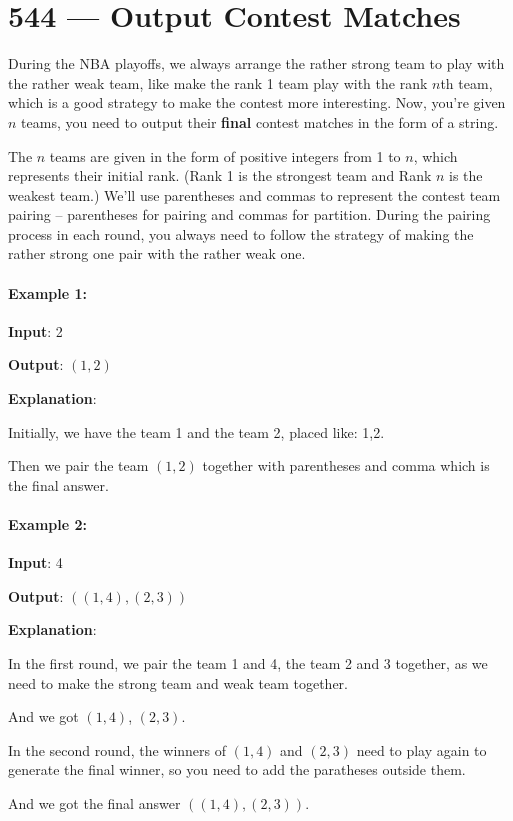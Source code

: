 \section{544 --- Output Contest Matches}
During the NBA playoffs, we always arrange the rather strong team to play with the rather weak team, like make the rank 1 team play with the rank $n$th team, which is a good strategy to make the contest more interesting. Now, you're given $n$ teams, you need to output their \textbf{final} contest matches in the form of a string.

The $n$ teams are given in the form of positive integers from 1 to $n$, which represents their initial rank. (Rank 1 is the strongest team and Rank $n$ is the weakest team.) We'll use parentheses and commas to represent the contest team pairing -- parentheses for pairing and commas for partition. During the pairing process in each round, you always need to follow the strategy of making the rather strong one pair with the rather weak one.

\paragraph{Example 1:}

\begin{flushleft}
\textbf{Input}: 2

\textbf{Output}: $(1,2)$

\textbf{Explanation}:
 
Initially, we have the team 1 and the team 2, placed like: 1,2.

Then we pair the team $(1,2)$ together with parentheses and comma which is the final answer.
\end{flushleft}

\paragraph{Example 2:}

\begin{flushleft}
\textbf{Input}: 4

\textbf{Output}: $((1,4),(2,3))$

\textbf{Explanation}:

In the first round, we pair the team 1 and 4, the team 2 and 3 together, as we need to make the strong team and weak team together.

And we got $(1,4)$, $(2,3)$.

In the second round, the winners of $ (1,4) $ and $ (2,3) $ need to play again to generate the final winner, so you need to add the paratheses outside them.

And we got the final answer $((1,4),(2,3))$.
\end{flushleft}

